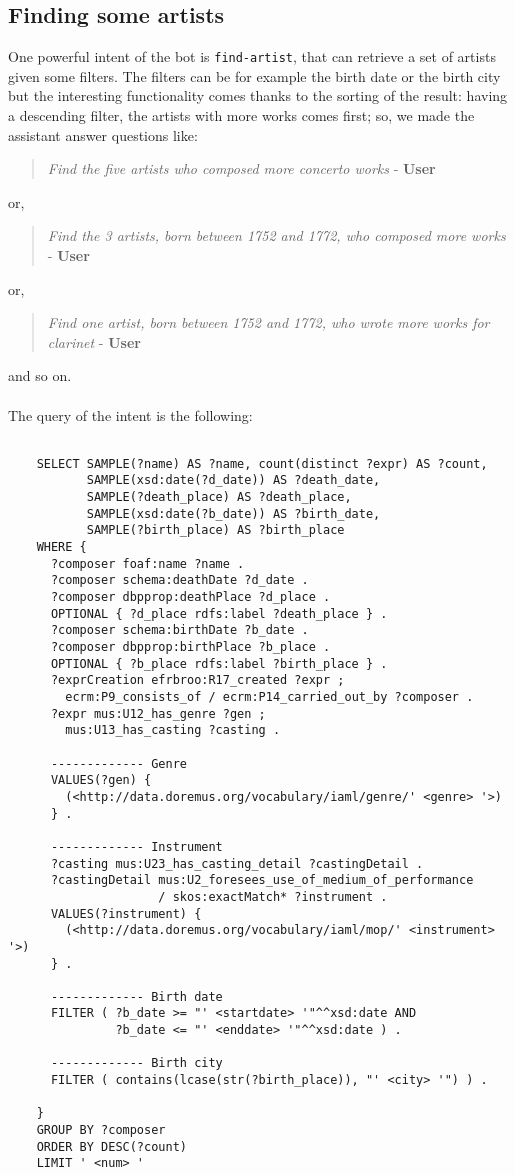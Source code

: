 	\subsection{Finding some artists}
	One powerful intent of the bot is \texttt{find-artist}, that can retrieve a set of artists given some filters. The filters can be for example the birth date or the birth city but the interesting functionality comes thanks to the sorting of the result: having a descending filter, the artists with more works comes first; so, we made the assistant answer questions like:
	\begin{verse}
	\textit{Find the five artists who composed more concerto works} - \textbf{User}\\
	\end{verse}
	or,
	\begin{verse}
	\textit{Find the 3 artists, born between 1752 and 1772, who composed more works} - \textbf{User}\\
	\end{verse}
	or,
	\begin{verse}
	\textit{Find one artist, born between 1752 and 1772, who wrote more works for clarinet} - \textbf{User}\\
	\end{verse}
	and so on.\\\\
	The query of the intent is the following:
	\begin{lstlisting}
	
	SELECT SAMPLE(?name) AS ?name, count(distinct ?expr) AS ?count,
	       SAMPLE(xsd:date(?d_date)) AS ?death_date,
	       SAMPLE(?death_place) AS ?death_place,
	       SAMPLE(xsd:date(?b_date)) AS ?birth_date,
	       SAMPLE(?birth_place) AS ?birth_place
	WHERE {
	  ?composer foaf:name ?name .
	  ?composer schema:deathDate ?d_date .
	  ?composer dbpprop:deathPlace ?d_place .
	  OPTIONAL { ?d_place rdfs:label ?death_place } .
	  ?composer schema:birthDate ?b_date .
	  ?composer dbpprop:birthPlace ?b_place .
	  OPTIONAL { ?b_place rdfs:label ?birth_place } .
	  ?exprCreation efrbroo:R17_created ?expr ;
	    ecrm:P9_consists_of / ecrm:P14_carried_out_by ?composer .
	  ?expr mus:U12_has_genre ?gen ;
	    mus:U13_has_casting ?casting .
	
	  ------------- Genre
	  VALUES(?gen) {
	    (<http://data.doremus.org/vocabulary/iaml/genre/' <genre> '>)
	  } .
		
	  ------------- Instrument
	  ?casting mus:U23_has_casting_detail ?castingDetail .
	  ?castingDetail mus:U2_foresees_use_of_medium_of_performance
	                 / skos:exactMatch* ?instrument .
	  VALUES(?instrument) {
	    (<http://data.doremus.org/vocabulary/iaml/mop/' <instrument> '>)
	  } .
		
	  ------------- Birth date
	  FILTER ( ?b_date >= "' <startdate> '"^^xsd:date AND
	           ?b_date <= "' <enddate> '"^^xsd:date ) .
		
	  ------------- Birth city
	  FILTER ( contains(lcase(str(?birth_place)), "' <city> '") ) .
		
	}
	GROUP BY ?composer
	ORDER BY DESC(?count)
	LIMIT ' <num> '
	\end{lstlisting}
	
